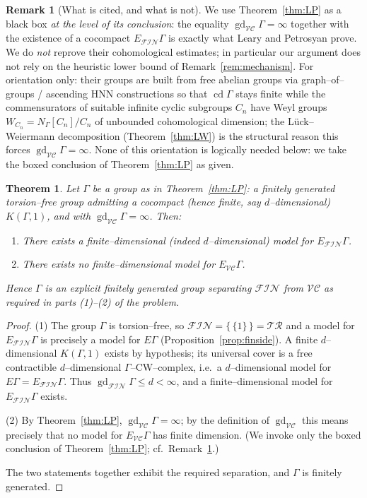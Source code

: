 \documentclass{amsart}
\newtheorem{theorem}{Theorem}
\theoremstyle{definition}
\newtheorem{remark}{Remark}
\newcommand{\FIN}{\mathcal{F\!I\!N}}
\newcommand{\VC}{\mathcal{V\!C}}
\newcommand{\gd}{\operatorname{gd}}
\newcommand{\cd}{\operatorname{cd}}
\begin{document}
\begin{remark}[What is cited, and what is not]\label{rem:blackbox}
We use Theorem~\ref{thm:LP} as a black box \emph{at the level of its conclusion}: the equality
$\gd_{\VC}\Gamma=\infty$ together with the existence of a cocompact $E_{\FIN}\Gamma$ is exactly
what Leary and Petrosyan prove. We do \emph{not} reprove their cohomological estimates; in
particular our argument does not rely on the heuristic lower bound of
Remark~\ref{rem:mechanism}. For orientation only: their groups are built from free abelian
groups via graph--of--groups / ascending HNN constructions so that $\cd\Gamma$ stays finite
while the commensurators of suitable infinite cyclic subgroups $C_n$ have Weyl groups
$W_{C_n}=N_\Gamma[C_n]/C_n$ of unbounded cohomological dimension; the Lück--Weiermann
decomposition (Theorem~\ref{thm:LW}) is the structural reason this forces
$\gd_{\VC}\Gamma=\infty$. None of this orientation is logically needed below: we take the
boxed conclusion of Theorem~\ref{thm:LP} as given.
\end{remark}

\begin{theorem}\label{thm:main}
Let $\Gamma$ be a group as in Theorem~\ref{thm:LP}: a finitely generated torsion--free group
admitting a cocompact (hence finite, say $d$--dimensional) $K(\Gamma,1)$, and with
$\gd_{\VC}\Gamma=\infty$. Then:
\begin{enumerate}
\item There exists a finite--dimensional (indeed $d$--dimensional) model for $E_{\FIN}\Gamma$.
\item There exists no finite--dimensional model for $E_{\VC}\Gamma$.
\end{enumerate}
Hence $\Gamma$ is an explicit finitely generated group separating $\FIN$ from $\VC$ as
required in parts (1)--(2) of the problem.
\end{theorem}

\begin{proof}
(1) The group $\Gamma$ is torsion--free, so $\FIN=\{\,\{1\}\,\}=\mathcal{TR}$ and a model for
$E_{\FIN}\Gamma$ is precisely a model for $E\Gamma$ (Proposition~\ref{prop:finside}). A finite
$d$--dimensional $K(\Gamma,1)$ exists by hypothesis; its universal cover is a free contractible
$d$--dimensional $\Gamma$--CW--complex, i.e.\ a $d$--dimensional model for
$E\Gamma=E_{\FIN}\Gamma$. Thus $\gd_{\FIN}\Gamma\le d<\infty$, and a finite--dimensional model
for $E_{\FIN}\Gamma$ exists.

(2) By Theorem~\ref{thm:LP}, $\gd_{\VC}\Gamma=\infty$; by the definition of $\gd_{\VC}$ this
means precisely that no model for $E_{\VC}\Gamma$ has finite dimension. (We invoke only the
boxed conclusion of Theorem~\ref{thm:LP}; cf.\ Remark~\ref{rem:blackbox}.)

The two statements together exhibit the required separation, and $\Gamma$ is finitely
generated.
\end{proof}
\end{document}
